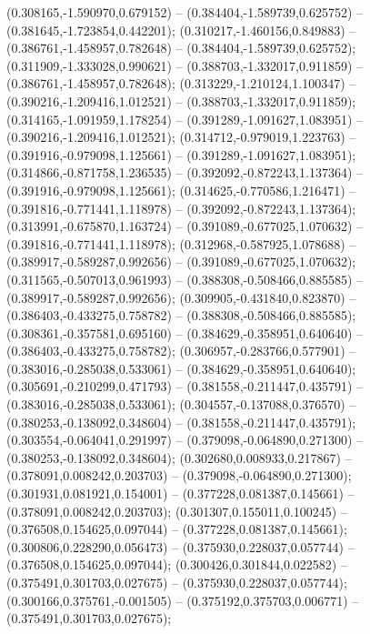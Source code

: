  (0.308165,-1.590970,0.679152) -- (0.384404,-1.589739,0.625752) -- (0.381645,-1.723854,0.442201);
 (0.310217,-1.460156,0.849883) -- (0.386761,-1.458957,0.782648) -- (0.384404,-1.589739,0.625752);
 (0.311909,-1.333028,0.990621) -- (0.388703,-1.332017,0.911859) -- (0.386761,-1.458957,0.782648);
 (0.313229,-1.210124,1.100347) -- (0.390216,-1.209416,1.012521) -- (0.388703,-1.332017,0.911859);
 (0.314165,-1.091959,1.178254) -- (0.391289,-1.091627,1.083951) -- (0.390216,-1.209416,1.012521);
 (0.314712,-0.979019,1.223763) -- (0.391916,-0.979098,1.125661) -- (0.391289,-1.091627,1.083951);
 (0.314866,-0.871758,1.236535) -- (0.392092,-0.872243,1.137364) -- (0.391916,-0.979098,1.125661);
 (0.314625,-0.770586,1.216471) -- (0.391816,-0.771441,1.118978) -- (0.392092,-0.872243,1.137364);
 (0.313991,-0.675870,1.163724) -- (0.391089,-0.677025,1.070632) -- (0.391816,-0.771441,1.118978);
 (0.312968,-0.587925,1.078688) -- (0.389917,-0.589287,0.992656) -- (0.391089,-0.677025,1.070632);
 (0.311565,-0.507013,0.961993) -- (0.388308,-0.508466,0.885585) -- (0.389917,-0.589287,0.992656);
 (0.309905,-0.431840,0.823870) -- (0.386403,-0.433275,0.758782) -- (0.388308,-0.508466,0.885585);
 (0.308361,-0.357581,0.695160) -- (0.384629,-0.358951,0.640640) -- (0.386403,-0.433275,0.758782);
 (0.306957,-0.283766,0.577901) -- (0.383016,-0.285038,0.533061) -- (0.384629,-0.358951,0.640640);
 (0.305691,-0.210299,0.471793) -- (0.381558,-0.211447,0.435791) -- (0.383016,-0.285038,0.533061);
 (0.304557,-0.137088,0.376570) -- (0.380253,-0.138092,0.348604) -- (0.381558,-0.211447,0.435791);
 (0.303554,-0.064041,0.291997) -- (0.379098,-0.064890,0.271300) -- (0.380253,-0.138092,0.348604);
 (0.302680,0.008933,0.217867) -- (0.378091,0.008242,0.203703) -- (0.379098,-0.064890,0.271300);
 (0.301931,0.081921,0.154001) -- (0.377228,0.081387,0.145661) -- (0.378091,0.008242,0.203703);
 (0.301307,0.155011,0.100245) -- (0.376508,0.154625,0.097044) -- (0.377228,0.081387,0.145661);
 (0.300806,0.228290,0.056473) -- (0.375930,0.228037,0.057744) -- (0.376508,0.154625,0.097044);
 (0.300426,0.301844,0.022582) -- (0.375491,0.301703,0.027675) -- (0.375930,0.228037,0.057744);
 (0.300166,0.375761,-0.001505) -- (0.375192,0.375703,0.006771) -- (0.375491,0.301703,0.027675);
